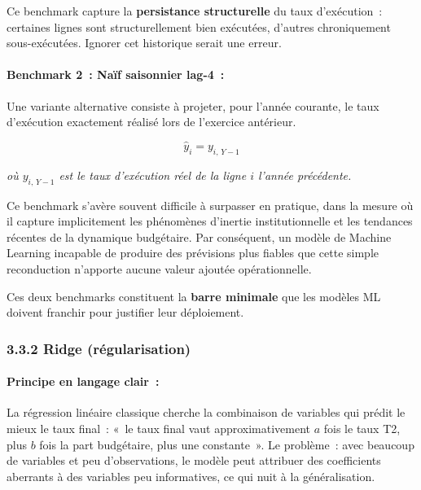 Ce benchmark capture la \textbf{persistance structurelle} du taux d'exécution~:
certaines lignes sont structurellement bien exécutées, d'autres chroniquement
sous-exécutées. Ignorer cet historique serait une erreur.

\paragraph{Benchmark 2~: Naïf saisonnier lag-4~:}

Une variante alternative consiste à projeter, pour l'année courante, le taux d'exécution
exactement réalisé lors de l'exercice antérieur.

$$\hat{y}_i = y_{i,\, Y-1}$$

\noindent\small\textit{où $y_{i,\, Y-1}$ est le taux d'exécution réel de la ligne $i$ l'année précédente.}\normalsize

Ce benchmark s'avère souvent difficile à surpasser en pratique, dans la mesure où il
capture implicitement les phénomènes d'inertie institutionnelle et les tendances récentes
de la dynamique budgétaire. Par conséquent, un modèle de Machine Learning incapable de
produire des prévisions plus fiables que cette simple reconduction n'apporte aucune
valeur ajoutée opérationnelle.

Ces deux benchmarks constituent la \textbf{barre minimale} que les modèles ML doivent
franchir pour justifier leur déploiement.

\subsubsection*{3.3.2 \quad Ridge (régularisation)}

\paragraph{Principe en langage clair~:}

La régression linéaire classique cherche la combinaison de variables qui prédit le
mieux le taux final~: «~le taux final vaut approximativement $a$ fois le taux T2,
plus $b$ fois la part budgétaire, plus une constante~». Le problème~: avec beaucoup
de variables et peu d'observations, le modèle peut attribuer des coefficients
aberrants à des variables peu informatives, ce qui nuit à la généralisation.

